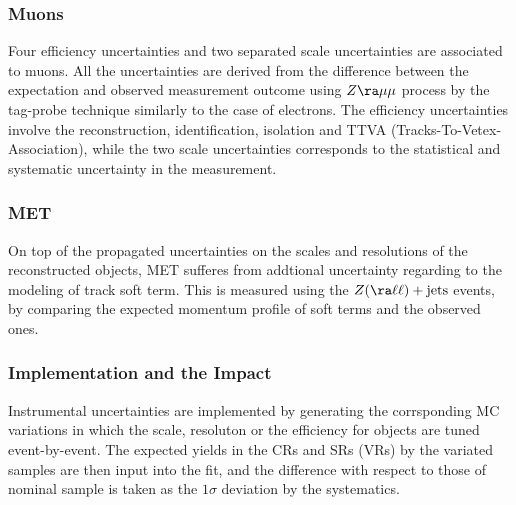 

\subsubsection{Muons}
Four efficiency uncertainties and two separated scale uncertainties are associated to muons.
All the uncertainties are derived from the difference between the expectation and observed measurement outcome using $Z\ra\mu\mu$ process by the tag-probe technique similarly to the case of electrons. 
The efficiency uncertainties involve the reconstruction, identification, isolation and TTVA (Tracks-To-Vetex-Association), while the two scale uncertainties corresponds to the statistical and systematic uncertainty in the measurement. \\


\subsubsection{MET} 
On top of the propagated uncertainties on the scales and resolutions of the reconstructed objects, MET sufferes from addtional uncertainty regarding to the modeling of track soft term.
This is measured using the $Z (\ra\ell\ell)+\mathrm{jets}$ events, by comparing the expected momentum profile of soft terms and the observed ones.  \\


\subsubsection{Implementation and the Impact} 
Instrumental uncertainties are implemented by generating the corrsponding MC variations in which the scale, resoluton or the efficiency for objects are tuned event-by-event.
The expected yields in the CRs and SRs (VRs) by the variated samples are then input into the fit, and the difference with respect to those of nominal sample is taken as the $1\sigma$ deviation by the systematics. \\

